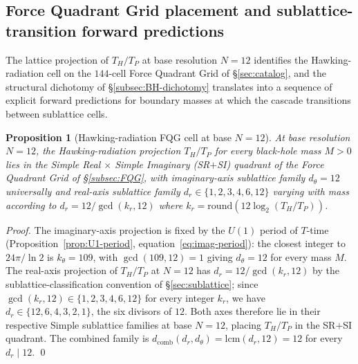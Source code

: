 \documentclass[11pt,a4paper]{article}
\newtheorem{proposition}[theorem]{Proposition}
\theoremstyle{definition}
\theoremstyle{remark}
\begin{document}
\subsection{Force Quadrant Grid placement and sublattice-transition forward predictions}\label{subsec:hawking-FQG-predictions}

The lattice projection of $T_{H}/T_{P}$ at base resolution $N = 12$ identifies the Hawking-radiation cell on the $144$-cell Force Quadrant Grid of \S\ref{sec:catalog}, and the structural dichotomy of \S\ref{subsec:BH-dichotomy} translates into a sequence of explicit forward predictions for boundary masses at which the cascade transitions between sublattice cells.

\begin{proposition}[Hawking-radiation FQG cell at base $N=12$]\label{prop:hawking-FQG-cell}
At base resolution $N = 12$, the Hawking-radiation projection $T_{H}/T_{P}$ for every black-hole mass $M > 0$ lies in the Simple Real $\times$ Simple Imaginary (SR$+$SI) quadrant of the Force Quadrant Grid of \S\ref{subsec:FQG}, with imaginary-axis sublattice family $d_{\theta} = 12$ universally and real-axis sublattice family $d_{r} \in \{1,2,3,4,6,12\}$ varying with mass according to $d_{r} = 12 / \gcd(k_{r},12)$ where $k_{r} = \mathrm{round}(12 \log_{2}(T_{H}/T_{P}))$.
\end{proposition}

\begin{proof}
The imaginary-axis projection is fixed by the $U(1)$ period of $T$-time (Proposition~\ref{prop:U1-period}, equation~\eqref{eq:imag-period}): the closest integer to $24\pi/\ln 2$ is $k_{\theta} = 109$, with $\gcd(109, 12) = 1$ giving $d_{\theta} = 12$ for every mass $M$. The real-axis projection of $T_{H}/T_{P}$ at $N=12$ has $d_{r} = 12/\gcd(k_{r}, 12)$ by the sublattice-classification convention of \S\ref{sec:sublattice}; since $\gcd(k_{r}, 12) \in \{1,2,3,4,6,12\}$ for every integer $k_{r}$, we have $d_{r} \in \{12,6,4,3,2,1\}$, the six divisors of $12$. Both axes therefore lie in their respective Simple sublattice families at base $N=12$, placing $T_{H}/T_{P}$ in the SR$+$SI quadrant. The combined family is $d_{\text{comb}}(d_{r}, d_{\theta}) = \mathrm{lcm}(d_{r}, 12) = 12$ for every $d_{r} \mid 12$. \qed
\end{proof}
\end{document}
